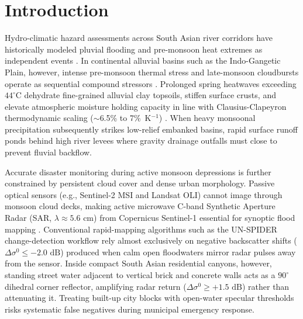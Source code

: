 \documentclass[OA,linenum]{InterPore}
\begin{document}


\maketitle

\section{Introduction}

Hydro-climatic hazard assessments across South Asian river corridors have historically modeled pluvial flooding and pre-monsoon heat extremes as independent events \cite{VanWesten2011, JatoEspino2025}. In continental alluvial basins such as the Indo-Gangetic Plain, however, intense pre-monsoon thermal stress and late-monsoon cloudbursts operate as sequential compound stressors \cite{Ganguli2025, Rohini2025}. Prolonged spring heatwaves exceeding $44^\circ\text{C}$ dehydrate fine-grained alluvial clay topsoils, stiffen surface crusts, and elevate atmospheric moisture holding capacity in line with Clausius-Clapeyron thermodynamic scaling ($\sim$6.5\% to 7\%~K$^{-1}$) \cite{Ganguli2025, Tallapragada2026}. When heavy monsoonal precipitation subsequently strikes low-relief embanked basins, rapid surface runoff ponds behind high river levees where gravity drainage outfalls must close to prevent fluvial backflow.

Accurate disaster monitoring during active monsoon depressions is further constrained by persistent cloud cover and dense urban morphology. Passive optical sensors (e.g., Sentinel-2 MSI and Landsat OLI) cannot image through monsoon cloud decks, making active microwave C-band Synthetic Aperture Radar (SAR, $\lambda \approx 5.6\text{ cm}$) from Copernicus Sentinel-1 essential for synoptic flood mapping \cite{MapAction2024}. Conventional rapid-mapping algorithms such as the UN-SPIDER change-detection workflow rely almost exclusively on negative backscatter shifts ($\Delta\sigma^0 \le -2.0\text{ dB}$) produced when calm open floodwaters mirror radar pulses away from the sensor. Inside compact South Asian residential canyons, however, standing street water adjacent to vertical brick and concrete walls acts as a $90^\circ$ dihedral corner reflector, amplifying radar return ($\Delta\sigma^0 \ge +1.5\text{ dB}$) rather than attenuating it. Treating built-up city blocks with open-water specular thresholds risks systematic false negatives during municipal emergency response.
\end{document}
